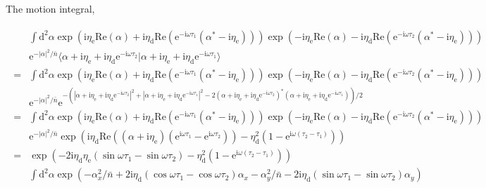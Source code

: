 \documentclass[10pt,fleqn]{article}
\newcommand{\ud}{\mathrm{d}}
\newcommand{\ue}{\mathrm{e}}
\newcommand{\ui}{\mathrm{i}}
\newcommand{\eqar}[1]
{
  \begin{align}
    #1
  \end{align}
}
\newcommand{\paren}[1]{{\left({#1}\right)}}
\newcommand{\abs}[1]{{\left|{#1}\right|}}
\begin{document}
The motion integral,
\eqar{
  \begin{split}
    &\int\ud^2\alpha
      \exp\paren{\ui\eta_{\mathrm{e}}\mathrm{Re}(\alpha)+\ui\eta_{\mathrm{d}}\mathrm{Re}(\ue^{-\ui\omega\tau_{1}}(\alpha^*-\ui\eta_{\mathrm{e}}))}
      \exp\paren{-\ui\eta_{\mathrm{e}}\mathrm{Re}(\alpha)-\ui\eta_{\mathrm{d}}\mathrm{Re}(\ue^{-\ui\omega\tau_{2}}(\alpha^*-\ui\eta_{\mathrm{e}}))}\\
    &\ue^{-\abs{\alpha}^2/{\bar n}}\langle\alpha+\ui\eta_{\mathrm{e}}+\ui\eta_{\mathrm{d}}\ue^{-\ui\omega\tau_{2}}|\alpha+\ui\eta_{\mathrm{e}}+\ui\eta_{\mathrm{d}}\ue^{-\ui\omega\tau_{1}}\rangle\\
    =&\int\ud^2\alpha
       \exp\paren{\ui\eta_{\mathrm{e}}\mathrm{Re}(\alpha)+\ui\eta_{\mathrm{d}}\mathrm{Re}(\ue^{-\ui\omega\tau_{1}}(\alpha^*-\ui\eta_{\mathrm{e}}))}
       \exp\paren{-\ui\eta_{\mathrm{e}}\mathrm{Re}(\alpha)-\ui\eta_{\mathrm{d}}\mathrm{Re}(\ue^{-\ui\omega\tau_{2}}(\alpha^*-\ui\eta_{\mathrm{e}}))}\\
    &\ue^{-\abs{\alpha}^2/{\bar n}}
      \ue^{-\paren{\abs{\alpha+\ui\eta_{\mathrm{e}}+\ui\eta_{\mathrm{d}}\ue^{-\ui\omega\tau_{2}}}^2+\abs{\alpha+\ui\eta_{\mathrm{e}}+\ui\eta_{\mathrm{d}}\ue^{-\ui\omega\tau_{1}}}^2-2\paren{\alpha+\ui\eta_{\mathrm{e}}+\ui\eta_{\mathrm{d}}\ue^{-\ui\omega\tau_{2}}}^*\paren{\alpha+\ui\eta_{\mathrm{e}}+\ui\eta_{\mathrm{d}}\ue^{-\ui\omega\tau_{1}}}}/2}\\
    =&\int\ud^2\alpha
       \exp\paren{\ui\eta_{\mathrm{e}}\mathrm{Re}(\alpha)+\ui\eta_{\mathrm{d}}\mathrm{Re}(\ue^{-\ui\omega\tau_{1}}(\alpha^*-\ui\eta_{\mathrm{e}}))}
       \exp\paren{-\ui\eta_{\mathrm{e}}\mathrm{Re}(\alpha)-\ui\eta_{\mathrm{d}}\mathrm{Re}(\ue^{-\ui\omega\tau_{2}}(\alpha^*-\ui\eta_{\mathrm{e}}))}\\
    &\ue^{-\abs{\alpha}^2/{\bar n}}
      \exp\paren{
      \ui\eta_{\mathrm{d}}\mathrm{Re}\paren{\paren{\alpha+\ui\eta_{\mathrm{e}}}
      \paren{\ue^{\ui\omega\tau_{1}}-\ue^{\ui\omega\tau_{2}}}}
      -\eta_{\mathrm{d}}^2\paren{1-\ue^{\ui\omega\paren{\tau_{2}-\tau_{1}}}}
      }\\
    =&\exp\paren{
       -2\ui\eta_{\mathrm{d}}
       \eta_{\mathrm{e}}\paren{\sin\omega\tau_{1}-\sin\omega\tau_{2}}
       -\eta_{\mathrm{d}}^2\paren{1-\ue^{\ui\omega\paren{\tau_{2}-\tau_{1}}}}
       }\\
    &\int\ud^2\alpha
      \exp\paren{
      -\alpha_x^2/{\bar n}
      +2\ui\eta_{\mathrm{d}}\paren{\cos\omega\tau_{1}-\cos\omega\tau_{2}}\alpha_x
      -\alpha_y^2/{\bar n}
      -2\ui\eta_{\mathrm{d}}\paren{\sin\omega\tau_{1}-\sin\omega\tau_{2}}\alpha_y
}
\end{split}}
\end{document}
